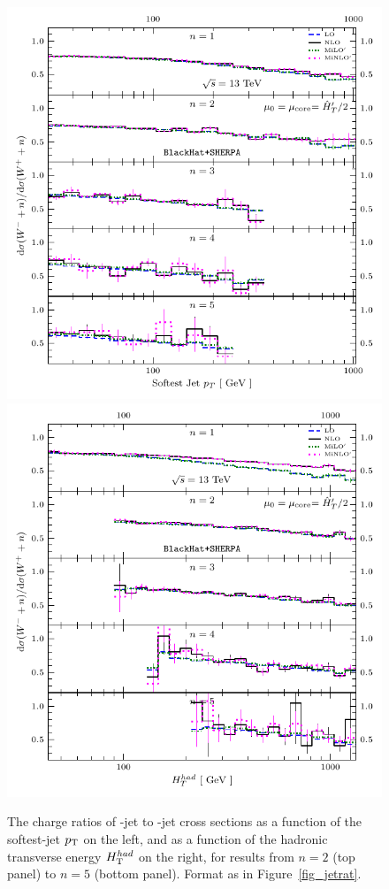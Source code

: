 \begin{figure}[t]

\includegraphics[clip,scale=0.75]{plots/flavorratio_Wm_Wp_13TeV_anti-kt-R4-Pt30_jets_jet_1_1_pt__Kn}
\includegraphics[clip,scale=0.75]{plots/flavorratio_Wm_Wp_13TeV_anti-kt-R4-Pt30_jets_HT_C}
\caption{The charge ratios of \Wmjn-jet to \Wpjn-jet cross sections as a function of
the softest-jet $p_{\textrm T}$ on the left, and as a function of
the hadronic transverse energy $H_{\textrm T}^{had}$ on the right, for results
from $n=2$ (top panel) to $n=5$ (bottom panel). Format as in
Figure~\ref{fig_jetrat}.
}
\label{fig_chargerat}
\end{figure}


